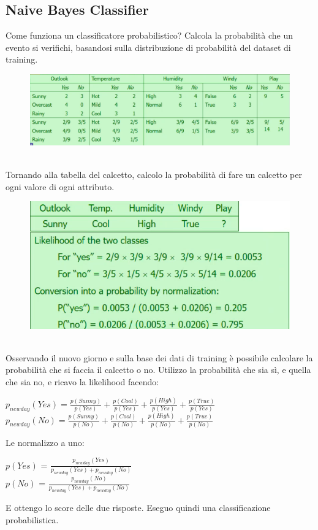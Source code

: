 \subsection{Naive Bayes Classifier}
Come funziona un classificatore probabilistico? Calcola la probabilità che un evento si verifichi, basandosi sulla distribuzione di probabilità del dataset di training. 
\\
\begin{figure}[th]
    \centering
    \includegraphics[scale=0.5]{ML/img/prob class.png}
\end{figure}
\\
Tornando alla tabella del calcetto, calcolo la probabilità di fare un calcetto per ogni valore di ogni attributo. 
\\
\begin{figure}[th]
    \centering
    \includegraphics[scale=0.5]{ML/img/new day.png}
\end{figure}
\\
Osservando il nuovo giorno e sulla base dei dati di training è possibile calcolare la probabilità che si faccia il calcetto o no. Utilizzo la probabilità che sia sì, e quella che sia no, e ricavo la likelihood facendo:
\begin{center}
    \begin{math}
        p_{newday}(Yes) = \frac{p(Sunny)}{p(Yes)} + \frac{p(Cool)}{p(Yes)} + \frac{p(High)}{p(Yes)} + \frac{p(True)}{p(Yes)}
    \end{math}
    \\
    \begin{math}
        p_{newday}(No) = \frac{p(Sunny)}{p(No)} + \frac{p(Cool)}{p(No)} + \frac{p(High)}{p(No)} + \frac{p(True)}{p(No)} 
    \end{math}
\end{center}
Le normalizzo a uno:
\begin{center}
    $p(Yes)$ = $\frac{p_{newday}(Yes)}{p_{newday}(Yes) + p_{newday}(No)}$
    \\
    $p(No)$ = $\frac{p_{newday}(No)}{p_{newday}(Yes) + p_{newday}(No)}$
\end{center}
E ottengo lo score delle due risposte. Eseguo quindi una classificazione probabilistica.

